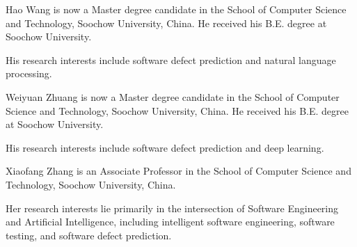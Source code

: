 \documentclass[journal]{IEEEtran}
\begin{document}
%




\clearpage

\begin{IEEEbiography}{Hao Wang}
is now a Master degree candidate in the School of Computer Science and Technology, Soochow University, China. He received his B.E. degree at Soochow University. 

His research interests include software defect prediction and natural language processing.
\end{IEEEbiography}


\begin{IEEEbiography}{Weiyuan Zhuang}
is now a Master degree candidate in the School of Computer Science and Technology, Soochow University, China. He received his B.E. degree at Soochow University. 

His research interests include software defect prediction and deep learning.
\end{IEEEbiography}


\begin{IEEEbiography}{Xiaofang Zhang}
is an Associate Professor in the School of Computer Science and Technology, Soochow University, China. 

Her research interests lie primarily in the intersection of Software Engineering and Artificial Intelligence, including intelligent software engineering, software testing, and software defect prediction.
\end{IEEEbiography}
\end{document}
